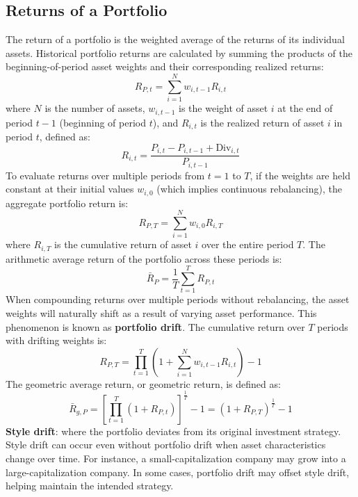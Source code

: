 \subsection{Returns of a Portfolio}
\label{subsec:Returns of a Portfolio}
The return of a portfolio is the weighted average of the returns of its individual assets. Historical portfolio returns are calculated by summing the products of the beginning-of-period asset weights and their corresponding realized returns:
\begin{equation}
	R_{P,t} = \sum_{i=1}^N w_{i,t-1} R_{i,t}
	\label{eq:portfolio_return_single_m8}
\end{equation}
where $N$ is the number of assets, $w_{i,t-1}$ is the weight of asset $i$ at the end of period $t-1$ (beginning of period $t$), and $R_{i,t}$ is the realized return of asset $i$ in period $t$, defined as:
\begin{equation}
	R_{i,t} = \frac{P_{i,t} - P_{i,t-1} + \text{Div}_{i,t}}{P_{i,t-1}}
	\label{eq:asset_realized_return_m8}
\end{equation}
To evaluate returns over multiple periods from $t=1$ to $T$, if the weights are held constant at their initial values $w_{i,0}$ (which implies continuous rebalancing), the aggregate portfolio return is:
\begin{equation}
	R_{P,T} = \sum_{i=1}^N w_{i,0} R_{i,T}
	\label{eq:portfolio_cumulative_no_drift_m8}
\end{equation}
where $R_{i,T}$ is the cumulative return of asset $i$ over the entire period $T$. 
The arithmetic average return of the portfolio across these periods is:
\begin{equation}
	\bar{R}_P = \frac{1}{T} \sum_{t=1}^T R_{P,t}
	\label{eq:portfolio_arithmetic_average_m8}
\end{equation}
When compounding returns over multiple periods without rebalancing, the asset weights will naturally shift as a result of varying asset performance. This phenomenon is known as \textbf{portfolio drift}. The cumulative return over $T$ periods with drifting weights is:
\begin{equation}
	R_{P,T} = \prod_{t=1}^T \left(1 + \sum_{i=1}^N w_{i,t-1} R_{i,t}\right) - 1
	\label{eq:portfolio_cumulative_drift_m8}
\end{equation}
The geometric average return, or geometric return, is defined as:
\begin{equation}
	\bar{R}_{g,P} = \left[ \prod_{t=1}^T (1 + R_{P,t}) \right]^{\frac{1}{T}} - 1 = (1 + R_{P,T})^{\frac{1}{T}} - 1
	\label{eq:portfolio_geometric_return_m8}
\end{equation}
\textbf{Style drift}: where the portfolio deviates from its original investment strategy. 
Style drift can occur even without portfolio drift when asset characteristics change over time. For instance, a small-capitalization company may grow into a large-capitalization company. 
In some cases, portfolio drift may offset style drift, helping maintain the intended strategy.

